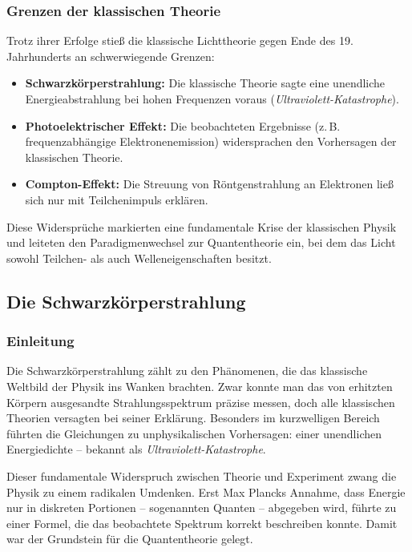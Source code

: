 \subsubsection{Grenzen der klassischen Theorie}
Trotz ihrer Erfolge stieß die klassische Lichttheorie gegen Ende des 19. Jahrhunderts an schwerwiegende Grenzen:

\begin{itemize}
	\item \textbf{Schwarzkörperstrahlung:} Die klassische Theorie sagte eine unendliche Energieabstrahlung bei hohen Frequenzen voraus (\emph{Ultraviolett-Katastrophe}).
	\item \textbf{Photoelektrischer Effekt:} Die beobachteten Ergebnisse (z.\,B. frequenzabhängige Elektronenemission) widersprachen den Vorhersagen der klassischen Theorie.
	\item \textbf{Compton-Effekt:} Die Streuung von Röntgenstrahlung an Elektronen ließ sich nur mit Teilchenimpuls erklären.
\end{itemize}

Diese Widersprüche markierten eine fundamentale Krise der klassischen Physik und leiteten den Paradigmenwechsel zur Quantentheorie ein, bei dem das Licht sowohl Teilchen- als auch Welleneigenschaften besitzt.

\subsection{Die Schwarzkörperstrahlung}

\subsubsection{Einleitung}
Die Schwarzkörperstrahlung zählt zu den Phänomenen, die das klassische Weltbild der Physik ins Wanken brachten. Zwar konnte man das von erhitzten Körpern ausgesandte Strahlungsspektrum präzise messen, doch alle klassischen Theorien versagten bei seiner Erklärung. Besonders im kurzwelligen Bereich führten die Gleichungen zu unphysikalischen Vorhersagen: einer unendlichen Energiedichte – bekannt als \emph{Ultraviolett-Katastrophe}.

Dieser fundamentale Widerspruch zwischen Theorie und Experiment zwang die Physik zu einem radikalen Umdenken. Erst Max Plancks Annahme, dass Energie nur in diskreten Portionen – sogenannten Quanten – abgegeben wird, führte zu einer Formel, die das beobachtete Spektrum korrekt beschreiben konnte. Damit war der Grundstein für die Quantentheorie gelegt.

